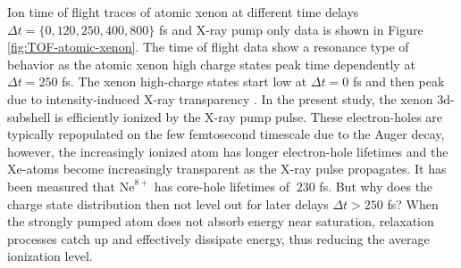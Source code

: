 Ion time of flight traces of atomic xenon at different time delays $\Delta t = \{0, 120, 250, 400, 800\}$ fs and X-ray pump only data is shown in Figure \ref{fig:TOF-atomic-xenon}. The time of flight data show a resonance type of behavior as the atomic xenon high charge states peak time dependently at $\Delta t = 250$ fs. The xenon high-charge states start low at $\Delta t = 0$ fs and then peak due to intensity-induced X-ray transparency \citep{Young-2010-Nature,Schorb-2012-PRL}. In the present study, the xenon 3d-subshell is efficiently ionized by the X-ray pump pulse. These electron-holes are typically repopulated on the few femtosecond timescale due to the Auger decay, however, the increasingly ionized atom has longer electron-hole lifetimes and the Xe-atoms become increasingly transparent as the X-ray pulse propagates. It has been measured that $\text{Ne}^{8+}$ has core-hole lifetimes of $~230$ fs. But why does the charge state distribution then not level out for later delays $\Delta t > 250$ fs? When the strongly pumped atom does not absorb energy near saturation, relaxation processes catch up and effectively dissipate energy, thus reducing the average ionization level.\\
